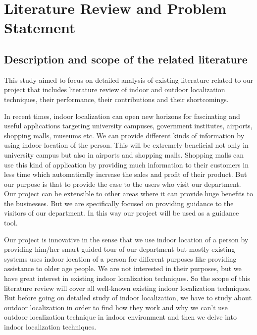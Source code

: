 
\chapter{Literature Review and Problem Statement} %
\label{Chapter2}

\section {Description and scope of the related literature}
This study aimed to focus on detailed analysis of existing literature related to our project that includes literature review of indoor and outdoor localization techniques, their performance, their contributions and their shortcomings. 

In recent times, indoor localization can open new horizons for fascinating and useful applications targeting university campuses, government institutes, airports, shopping malls, museums etc. We can provide different kinds of information by using indoor location of the person. This will be extremely beneficial not only in university campus but also in airports and shopping malls. Shopping malls can use this kind of application by providing much information to their customers in less time which automatically increase the sales and profit of their product. But our purpose is that to provide the ease to the users who visit our department. Our project can be extensible to other areas where it can provide huge benefits to the businesses. But we are specifically focused on providing guidance to the visitors of our department. In this way our project will be used as a guidance tool. 

Our project is innovative in the sense that we use indoor location of a person by providing him/her smart guided tour of our department but mostly existing systems uses indoor location of a person for different purposes like providing assistance to older age people. We are not interested in their purposes, but we have great interest in existing indoor localization techniques. So the scope of this literature review will cover all well-known existing indoor localization techniques. But before going on detailed study of indoor localization, we have to study about outdoor localization in order to find how they work and why we can’t use outdoor localization technique in indoor environment and then we delve into indoor localization techniques. 


